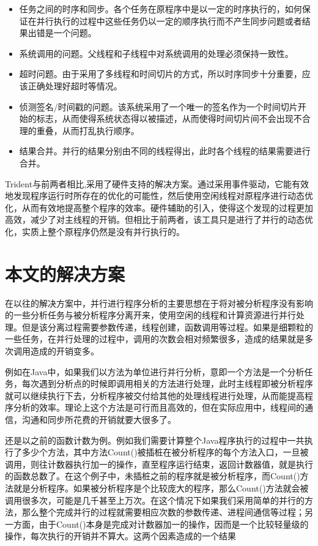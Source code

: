 \begin{itemize}
	\item 任务之间的时序和同步。各个任务在原程序中是以一定的时序执行的，如何保证在并行执行的过程中这些任务仍以一定的顺序执行而不产生同步问题或者结果出错是一个问题。
	\item 系统调用的问题。父线程和子线程中对系统调用的处理必须保持一致性。
	\item 超时问题。由于采用了多线程和时间切片的方式，所以时序同步十分重要，应该正确处理好超时等情况。
	\item 侦测签名/时间戳的问题。该系统采用了一个唯一的签名作为一个时间切片开始的标志，从而使得系统状态得以被描述，从而使得时间切片间不会出现不合理的重叠，从而打乱执行顺序。
	\item 结果合并。并行的结果分别由不同的线程得出，此时各个线程的结果需要进行合并。
\end{itemize}

Trident\cite{eventDri}与前两者相比,采用了硬件支持的解决方案。通过采用事件驱动，它能有效地发现程序运行时所存在的优化的可能性，然后使用空闲线程对原程序进行动态优化，从而有效地提高整个程序的效率。硬件辅助的引入，使得这个发现的过程更加高效，减少了对主线程的开销。但相比于前两者，该工具只是进行了并行的动态优化，实质上整个原程序仍然是没有并行执行的。

\section{本文的解决方案}

在以往的解决方案中，并行进行程序分析的主要思想在于将对被分析程序没有影响的一些分析任务与被分析程序分离开来，使用空闲的线程和计算资源进行并行处理。但是该分离过程需要参数传递，线程创建，函数调用等过程。如果是细颗粒的一些任务，在并行处理的过程中，调用的次数会相对频繁很多，造成的结果就是多次调用造成的开销变多。

例如在Java中，如果我们以方法为单位进行并行分析，意即一个方法是一个分析任务，每次遇到分析点的时候即调用相关的方法进行处理，此时主线程即被分析程序就可以继续执行下去，分析程序被交付给其他的处理线程进行处理，从而能提高程序分析的效率。理论上这个方法是可行而且高效的，但在实际应用中，线程间的通信，沟通和同步所花费的开销就要大很多了。

还是以之前的函数计数为例。例如我们需要计算整个Java程序执行的过程中一共执行了多少个方法，其中方法Count()被插桩在被分析程序的每个方法入口，一旦被调用，则往计数器执行加一的操作，直至程序运行结束，返回计数器值，就是执行的函数总数了。在这个例子中，未插桩之前的程序就是被分析程序，而Count()方法就是分析程序。如果被分析程序是个比较庞大的程序，那么Count()方法就会被调用很多次，可能是几千甚至上万次。在这个情况下如果我们采用简单的并行的方法，那么整个完成并行的过程就需要相应次数的参数传递、进程间通信等过程；另一方面，由于Count()本身是完成对计数器加一的操作，因而是一个比较轻量级的操作，每次执行的开销并不算大。这两个因素造成的一个结果

